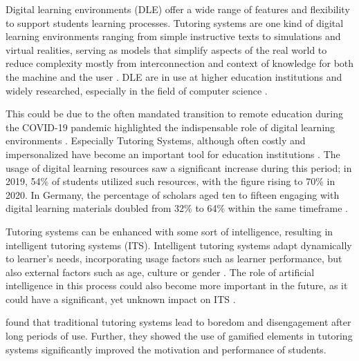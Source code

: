 Digital learning environments (DLE) offer a wide range of features and flexibility to support students learning processes. Tutoring systems are one kind of digital learning environments ranging from simple instructive texts to simulations and virtual realities, serving as models that simplify aspects of the real world to reduce complexity mostly from interconnection and context of knowledge for both the machine and the user \parencite{psotkaIntelligentTutoringSystems1988}.
DLE are in use at higher education institutions and widely researched, especially in the field of computer science \parencite{zawacki-richterSystematicReviewResearch2019}.


This could be due to the often mandated transition to remote education during the COVID-19 pandemic highlighted the indispensable role of digital learning environments \parencite{garcia-moralesTransformationHigherEducation2021}.
Especially Tutoring Systems, although often costly and impersonalized have become an important tool for education institutions \parencite{elhadbiReviewStudyAdaptive2024}.
The usage of digital learning resources saw a significant increase during this period; in 2019, 54\% of students utilized such resources, with the figure rising to 70\% in 2020.
In Germany, the percentage of scholars aged ten to fifteen engaging with digital learning materials doubled from 32\% to 64\% within the same timeframe \parencite{statistischesbundesamtDigitalesLernenNimmt2020}.


Tutoring systems can be enhanced with some sort of intelligence, resulting in intelligent tutoring systems (ITS). Intelligent tutoring systems adapt dynamically to learner's needs, incorporating usage factors such as learner performance, but also external factors such as age, culture or gender \parencite{nkambouAdvancesIntelligentTutoring2010, gonzalezGamificationIntelligentTutoring2014}.
The role of artificial intelligence in this process could also become more important in the future, as it could have a significant, yet unknown impact on ITS \parencite{zawacki-richterSystematicReviewResearch2019}.

\textcite{jacksonMotivationPerformanceGamebased2013} found that traditional tutoring systems lead to boredom and disengagement after long periods of use. Further, they showed the use of gamified elements in tutoring systems significantly improved the motivation and performance of students.

